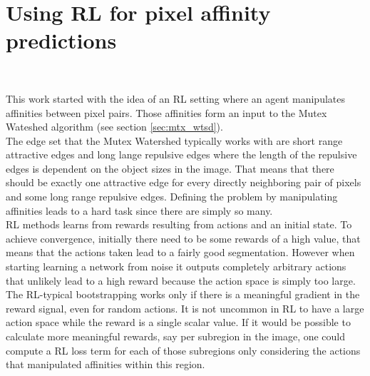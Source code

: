 \section{Using RL for pixel affinity predictions}~\label{sec:rl_for_seg}

This work started with the idea of an RL setting where an agent manipulates affinities between pixel pairs. Those affinities form an input to the Mutex Wateshed algorithm (see section \ref{sec:mtx_wtsd}).\\
The edge set that the Mutex Watershed typically works with are short range attractive edges and long lange repulsive edges where the length of the repulsive edges is dependent on the object sizes in the image. That means that there should be exactly one attractive edge for every directly neighboring pair of pixels and some long range repulsive edges. Defining the problem by manipulating affinities leads to a hard task since there are simply so many.\\
RL methods learns from rewards resulting from actions and an initial state. To achieve convergence, initially there need to be some rewards of a high value, that means that the actions taken lead to a fairly good segmentation. However when starting learning a network from noise it outputs completely arbitrary actions that unlikely lead to a high reward because the action space is simply too large.\\
The RL-typical bootstrapping works only if there is a meaningful gradient in the reward signal, even for random actions. It is not uncommon in RL to have a large action space while the reward is a single scalar value. If it would be possible to calculate more meaningful rewards, say per subregion in the image, one could compute a RL loss term for each of those subregions only considering the actions that manipulated affinities within this region.\\

